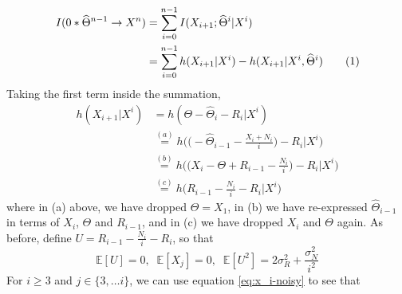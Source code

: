 \documentclass[letterpaper, 10pt, conference]{ieeeconf}
\newcommand\numberthis{\stepcounter{equation}\tag{\theequation}}
\begin{document}
\begin{align*}
	I(0*\widehat\Theta^{n-1} \rightarrow X^n) &= \sum_{i=0}^{n-1}{I(X_{i+1}; \widehat\Theta^i | X^i)} \\
											  &= \sum_{i=0}^{n-1}{h(X_{i+1} | X^i) - h(X_{i+1} | X^i, \widehat\Theta^i)} \numberthis
\end{align*}
Taking the first term inside the summation,
\begin{align*}
	h(X_{i+1} | X^i) &= h(\Theta - \widehat\Theta_i - R_i | X^i) \\
					&\overset{(a)}{=} h \bigg( \bigg( - \widehat\Theta_{i-1} - \frac{X_i + N_i}{i} \bigg) - R_i \bigg| X^i \bigg) \\
					&\overset{(b)}{=} h \bigg( \bigg( X_i - \Theta + R_{i-1} - \frac{N_i}{i} \bigg) - R_i \bigg| X^i \bigg) \\
					&\overset{(c)}{=} h \bigg( R_{i-1} - \frac{N_i}{i} - R_i \bigg| X^i \bigg)
\end{align*}
where in (a) above, we have dropped $\Theta = X_1$, in (b) we have re-expressed $\widehat\Theta_{i-1}$ in terms of $X_i$, $\Theta$ and $R_{i-1}$, and in (c) we have dropped $X_i$ and $\Theta$ again. As before, define $U = R_{i-1} - \frac{N_i}{i} - R_i$, so that
\begin{equation*}
	\mathbb{E}[U] = 0,\; \; \mathbb{E}[X_j] = 0, \; \; \mathbb{E}[U^2] = 2 \sigma_R^2 + \frac{\sigma_N^2}{i^2}
\end{equation*}
For $i \geq 3$ and $j \in \{3, \ldots i\}$, we can use equation \eqref{eq:x_i-noisy} to see that
\end{document}
